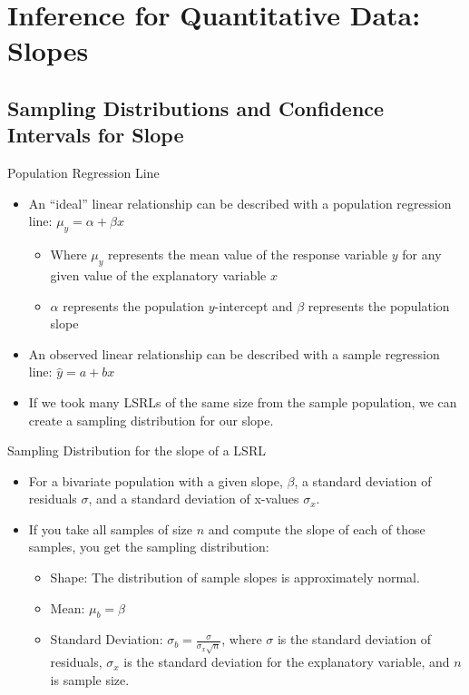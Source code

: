 \documentclass[../stats.tex]{subfiles}
\begin{document}
\chapter{Inference for Quantitative Data: Slopes}
\section{Sampling Distributions and Confidence Intervals for Slope}
Population Regression Line 
\begin{itemize}
    \item An ``ideal'' linear relationship can be described with a population regression line: $\mu_y=\alpha + \beta x$
    \begin{itemize}
        \item Where $\mu_y$ represents the mean value of the response variable $y$ for any given value of the explanatory variable $x$
        \item $\alpha$ represents the population $y$-intercept and $\beta$ represents the population slope 
    \end{itemize}
    \item An observed linear relationship can be described with a sample regression line: $\hat{y}=a+bx$
    \item If we took many LSRLs of the same size from the sample population, we can create a sampling distribution for our slope.
\end{itemize}

Sampling Distribution for the slope of a LSRL 
\begin{itemize}
    \item For a bivariate population with a given slope, $\beta$, a standard deviation of residuals $\sigma$, and a standard deviation of x-values $\sigma_x$.
    \item If you take all samples of size $n$ and compute the slope of each of those samples, you get the sampling distribution: 
    \begin{itemize}
        \item Shape: The distribution of sample slopes is approximately normal.
        \item Mean: $\mu_b = \beta$
        \item Standard Deviation: $\sigma_b = \frac{\sigma}{\sigma_x\sqrt{n}}$, where $\sigma$ is the standard deviation of residuals, $\sigma_x$ is the standard deviation for the explanatory variable, and $n$ is sample size.
    \end{itemize}
\end{itemize}
\end{document}
